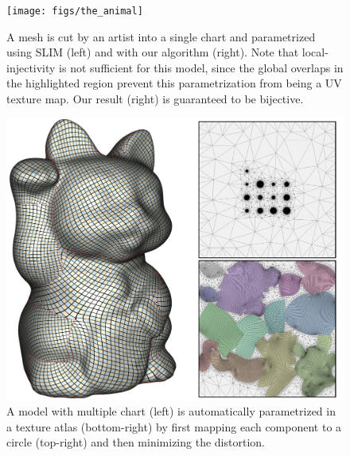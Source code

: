 \begin{figure}[t]
\texttt{[image: figs/the\_animal]}
\caption{A mesh is cut by an artist into a single chart and parametrized using SLIM \protect\cite{Rabinovich:2017} (left) and with our algorithm (right). Note that local-injectivity is not sufficient for this model, since the global overlaps in the highlighted region prevent this parametrization from being a UV texture map. Our result (right) is guaranteed to be bijective.}
\label{scaf:fig:manuallycut}
\vspace{-0.2cm}
\end{figure}

\begin{figure}[t]
\includegraphics[width=\columnwidth]{figs/maneki_neko_colorful}
\caption{A model with multiple chart (left) is automatically parametrized in a texture atlas (bottom-right) by first mapping each component to a circle (top-right) and then minimizing the distortion.}
\label{scaf:fig:packing2D}
\end{figure}


